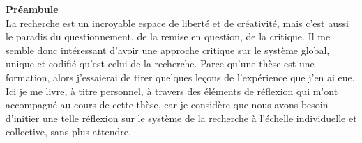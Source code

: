 \setcounter{counterboxspe}{0}

\setcounter{counterboxspetosave}{0}
\setcounter{Empreinte}{\thecounterboxspetosave{}}
\setcounter{GT}{\thecounterboxspetosave{}}
\setcounter{Collaborative}{\thecounterboxspetosave{}}
\setcounter{Conferences}{\thecounterboxspetosave{}}
\setcounter{Publication}{\thecounterboxspetosave{}}



\label{annex_temoignage}






\newpage






{\noindent\Large\textbf{Préambule}}
\\

La recherche est un incroyable espace de liberté et de créativité, mais c'est aussi le paradis du questionnement, de la remise en question, de la critique. Il me semble donc intéressant d'avoir une approche critique sur le système global, unique et codifié qu'est celui de la recherche. Parce qu'une thèse est une formation, alors j'essaierai de tirer quelques leçons de l'expérience que j'en ai eue. Ici je me livre, à titre personnel, à travers des éléments de réflexion qui m'ont accompagné au cours de cette thèse, car je considère que nous avons besoin d'initier une telle réflexion sur le système de la recherche à l'échelle individuelle et collective, sans plus attendre.
\\



